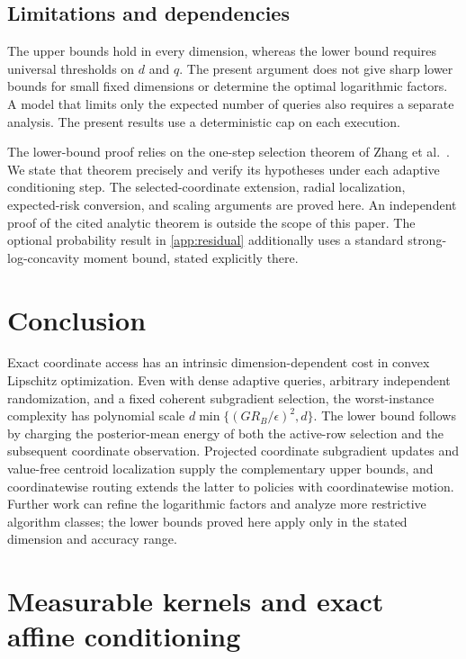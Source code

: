 \documentclass[11pt]{article}
\numberwithin{equation}{section}
\theoremstyle{definition}
\theoremstyle{remark}
\newcommand{\eps}{\epsilon}
\begin{document}
\subsection{Limitations and dependencies}

The upper bounds hold in every dimension, whereas the lower bound requires universal thresholds on $d$ and $q$. The present argument does not give sharp lower bounds for small fixed dimensions or determine the optimal logarithmic factors. A model that limits only the expected number of queries also requires a separate analysis. The present results use a deterministic cap on each execution.

The lower-bound proof relies on the one-step selection theorem of Zhang et al.\ \cite[Theorem~14]{ZZQL2026}. We state that theorem precisely and verify its hypotheses under each adaptive conditioning step. The selected-coordinate extension, radial localization, expected-risk conversion, and scaling arguments are proved here. An independent proof of the cited analytic theorem is outside the scope of this paper. The optional probability result in \cref{app:residual} additionally uses a standard strong-log-concavity moment bound, stated explicitly there.

\section{Conclusion}

Exact coordinate access has an intrinsic dimension-dependent cost in convex Lipschitz optimization. Even with dense adaptive queries, arbitrary independent randomization, and a fixed coherent subgradient selection, the worst-instance complexity has polynomial scale $d\min\{(GR_B/\eps)^2,d\}$. The lower bound follows by charging the posterior-mean energy of both the active-row selection and the subsequent coordinate observation. Projected coordinate subgradient updates and value-free centroid localization supply the complementary upper bounds, and coordinatewise routing extends the latter to policies with coordinatewise motion. Further work can refine the logarithmic factors and analyze more restrictive algorithm classes; the lower bounds proved here apply only in the stated dimension and accuracy range.

\appendix
\section{Measurable kernels and exact affine conditioning}\label{app:kernels}
\end{document}
